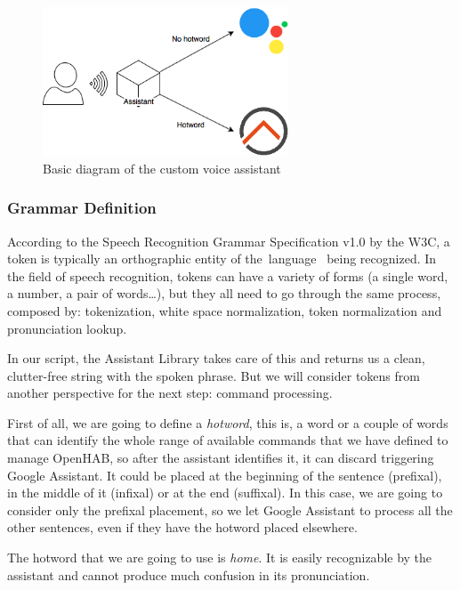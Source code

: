 \begin{figure}
	\centering
	\includegraphics[width=0.65\textwidth]{images/Chapter_07/custom-assistant-simple.png}
	\caption{Basic diagram of the custom voice assistant}
	\label{fig:custom-assistant-simple}
\end{figure}

\subsubsection{Grammar Definition}
According to the Speech Recognition Grammar Specification v1.0 by the W3C, a token is typically an orthographic entity of the language 
being recognized. In the field of speech recognition, tokens can have a variety of forms (a single word, a number, a pair of words…),
but they all need to go through the same process, composed by: tokenization, white space normalization, token normalization and
pronunciation lookup.\cite{w3SpeechGrammar}

In our script, the Assistant Library takes care of this and returns us a clean, clutter-free string with the spoken phrase. But we
will consider tokens from another perspective for the next step: command processing.

First of all, we are going to define a \textit{hotword}, this is, a word or a couple of words that can identify the whole range of
available commands that we have defined to manage OpenHAB, so after the assistant identifies it, it can discard triggering Google
Assistant. It could be placed at the beginning of the sentence (prefixal), in the middle of it (infixal) or at the end (suffixal).
In this case, we are going to consider only the prefixal placement, so we let Google Assistant to process all the other sentences,
even if they have the hotword placed elsewhere.

The hotword that we are going to use is \textit{home}. It is easily recognizable by the assistant and cannot produce much confusion
in its pronunciation.

